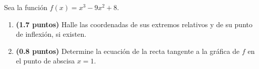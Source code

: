 
Sea la función $f(x)=x^3-9x^2+8$.
\begin{enumerate}[label=\alph*)]
\item \textbf{(1.7 puntos)} Halle las coordenadas de sus extremos relativos y de su punto de inflexión, si existen.
\item \textbf{(0.8 puntos)} Determine la ecuación de la recta tangente a la gráfica de $f$ en el punto de abscisa $x=1$.
\end{enumerate}
